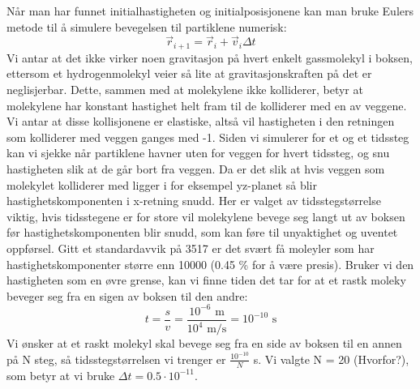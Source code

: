 \documentclass[reprint,english,notitlepage]{revtex4-1}
\begin{document}
	\vspace{0.5cm}

	Når man har funnet initialhastigheten og initialposisjonene kan man bruke Eulers
	metode til å simulere bevegelsen til partiklene numerisk:
		$$\vec{r}_{i+1} = \vec{r}_{i} + \vec{v}_i\Delta t$$
	Vi antar at det ikke virker noen gravitasjon på hvert enkelt gassmolekyl i
	boksen, ettersom et hydrogenmolekyl veier så lite at gravitasjonskraften på det er
	neglisjerbar. Dette, sammen med at molekylene ikke kolliderer, betyr at
	molekylene har konstant hastighet helt fram til de kolliderer
	med en av veggene. Vi antar at disse kollisjonene er elastiske,
	altså vil hastigheten i den retningen som kolliderer med veggen ganges med -1.
	Siden vi simulerer for et og et tidssteg kan vi sjekke når partiklene havner uten for veggen
	for hvert tidssteg, og snu hastigheten slik at de går bort fra veggen.
	Da er det slik at hvis veggen som molekylet kolliderer med ligger i for eksempel
	yz-planet så blir hastighetskomponenten i x-retning snudd. Her er valget av
	tidsstegstørrelse viktig, hvis tidsstegene er for store vil molekylene bevege
	seg langt ut av boksen før hastighetskomponenten blir snudd, som kan føre til
	unyaktighet og uventet oppførsel. Gitt et standardavvik på 3517 er det svært
	få moleyler som har hastighetskomponenter større enn 10000 (0.45 \% for å være presis).
	Bruker vi den hastigheten som en øvre grense, kan vi finne tiden det tar for at et
	rastk moleky beveger seg fra en sigen av boksen til den andre:
	$$t = \frac{s}{v} = \frac{10^{-6}\text{ m}}{10^{4}\text{ m/s}} = 10^{-10} \text{ s}$$
	Vi ønsker at et raskt molekyl
	skal bevege seg fra en side av boksen til en annen på N steg, så
	tidsstegstørrelsen vi trenger er $\frac{10^{-10}}{N}$ s. Vi valgte N = 20 (Hvorfor?),
	som betyr at vi bruke $\Delta t = 0.5 \cdot 10^{-11}$.

	\vspace{0.5cm}
\end{document}
